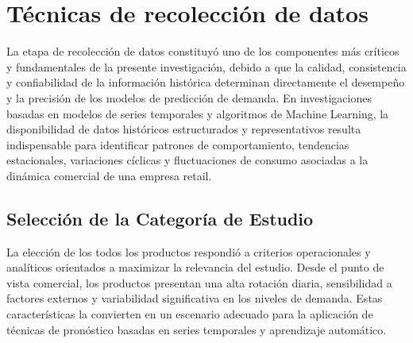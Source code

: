 		
		\section{Técnicas de recolección de datos}
		
		La etapa de recolección de datos constituyó uno de los componentes más críticos y fundamentales de la presente investigación, debido a que la calidad, consistencia y confiabilidad de la información histórica determinan directamente el desempeño y la precisión de los modelos de predicción de demanda. En investigaciones basadas en modelos de series temporales y algoritmos de Machine Learning, la disponibilidad de datos históricos estructurados y representativos resulta indispensable para identificar patrones de comportamiento, tendencias estacionales, variaciones cíclicas y fluctuaciones de consumo asociadas a la dinámica comercial de una empresa retail.


			\subsection{Selección de la Categoría de Estudio}

			La elección de los todos los productos respondió a criterios operacionales y analíticos 
			orientados a maximizar la relevancia del estudio. Desde el punto de vista comercial, 
			los productos presentan una alta rotación diaria, sensibilidad a factores externos y 
			variabilidad significativa en los niveles de demanda. Estas características la convierten 
			en un escenario adecuado para la aplicación de técnicas de pronóstico basadas en series 
			temporales y aprendizaje automático.


